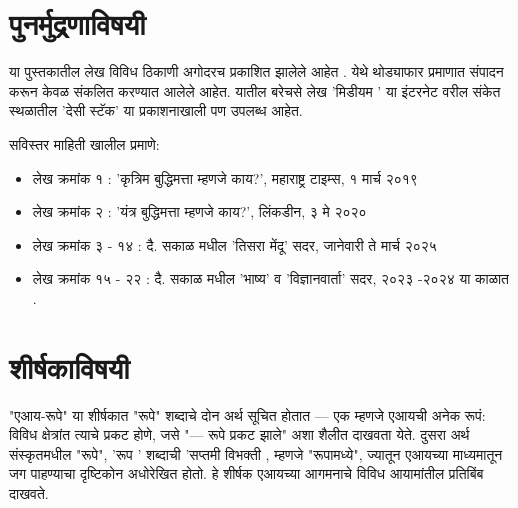 \chapter*{पुनर्मुद्रणाविषयी}

या पुस्तकातील लेख विविध ठिकाणी अगोदरच प्रकाशित झालेले आहेत .  येथे थोड्याफार प्रमाणात संपादन करून केवळ संकलित करण्यात आलेले आहेत.  यातील बरेचसे लेख 'मिडीयम '  या इंटरनेट वरील संकेत स्थळातील 'देसी स्टॅक' या प्रकाशनाखाली पण उपलब्ध आहेत. 

सविस्तर माहिती खालील प्रमाणे:
\begin{itemize}
	\item लेख क्रमांक १ : 'कृत्रिम बुद्धिमत्ता म्हणजे काय?', महाराष्ट्र टाइम्स, १  मार्च २०१९
	\item  लेख क्रमांक २ : 'यंत्र बुद्धिमत्ता म्हणजे काय?', लिंकडीन, ३ मे २०२०  
	\item  लेख क्रमांक ३ - १४ : दै. सकाळ मधील 'तिसरा मेंदू' सदर, जानेवारी ते मार्च २०२५
	\item  लेख क्रमांक १५ - २२ : दै. सकाळ मधील 'भाष्य' व 'विज्ञानवार्ता' सदर, २०२३ -२०२४  या काळात . 
\end{itemize}



\chapter*{शीर्षकाविषयी }

"एआय-रूपे" या शीर्षकात "रूपे" शब्दाचे दोन अर्थ सूचित होतात — एक म्हणजे एआयची अनेक रूपं: विविध क्षेत्रांत त्याचे प्रकट होणे, जसे "--- रूपे प्रकट झाले" अशा शैलीत दाखवता येते. दुसरा अर्थ संस्कृतमधील "रूपे", 'रूप '  शब्दाची 'सप्तमी विभक्ती , म्हणजे "रूपामध्ये", ज्यातून एआयच्या माध्यमातून जग पाहण्याचा दृष्टिकोन अधोरेखित होतो. हे शीर्षक एआयच्या आगमनाचे विविध आयामांतील प्रतिबिंब दाखवते.